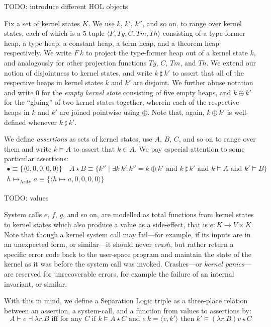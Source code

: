 \documentclass[a4paper, UKenglish, cleveref, autoref, thm-restate, colorlinks]{lipics-v2021}
\newcommand{\todo}[1]{}
\renewcommand{\todo}[1]{{\color{red} TODO: {#1}}}
\newcommand{\lam}[1]{\lambda{#1}.}
\newcommand{\xsts}[1]{\exists{#1}.}
\begin{document}
\todo{introduce different HOL objects}

Fix a set of kernel states $K$.
We use $k$, $k'$, $k''$, and so on, to range over kernel states, each of which is a $5$-tuple $\langle F, Ty, C, Tm, Th \rangle$ consisting of a type-former heap, a type heap, a constant heap, a term heap, and a theorem heap respectively.
We write $F\ k$ to project the type-former heap out of a kernel state $k$, and analogously for other projection functions $Ty$, $C$, $Tm$, and $Th$.
We extend our notion of disjointness to kernel states, and write $k\ \sharp\ k'$ to assert that all of the respective heaps in kernel states $k$ and $k'$ are disjoint.
We further abuse notation and write $0$ for the \emph{empty kernel state} consisting of five empty heaps, and $k \oplus k'$ for the ``gluing'' of two kernel states together, wherein each of the respective heaps in $k$ and $k'$ are joined pointwise using $\oplus$.
Note that, again, $k \oplus k'$ is well-defined whenever $k\ \sharp\ k'$.

We define \emph{assertions} as sets of kernel states, use $A$, $B$, $C$, and so on to range over them and write $k \vDash A$ to assert that $k \in A$.
We pay especial attention to some particular assertions:
\begin{gather*}
\bullet \equiv \{ \langle 0, 0, 0, 0, 0 \rangle \}
\quad
A \star B \equiv \{ k'' \mid \xsts{k\ k'}k'' = k \oplus k' \text{ and } k\ \sharp\ k' \text{ and } k \vDash A \text{ and } k' \vDash B \}
\\[0.5ex]
h \mapsto_{\text{Arity}} a \equiv \{ \langle h \mapsto a, 0, 0, 0, 0 \rangle \}
\end{gather*}

\todo{values}

System calls $e$, $f$, $g$, and so on, are modelled as total functions from kernel states to kernel states which also produce a value as a side-effect, that is $e : K \rightarrow V \times K$.
Note that though a kernel system call may fail---for example, if its inputs are in an unexpected form, or similar---it should never \emph{crash}, but rather return a specific error code back to the user-space program and maintain the state of the kernel as it was before the system call was invoked.
Crashes---or \emph{kernel panics}---are reserved for unrecoverable errors, for example the failure of an internal invariant, or similar.

With this in mind, we define a Separation Logic triple as a three-place relation between an assertion, a system-call, and a function from values to assertions by:
\begin{displaymath}
A \vdash e \dashv \lam{r}B \text{ iff for any } C \text{ if } k \vDash A \star C \text{ and } e\ k = \langle v, k' \rangle \text{ then } k' \vDash (\lam{r}B)v \star C
\end{displaymath}
\end{document}
